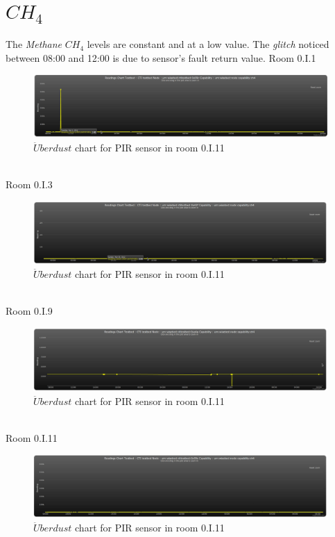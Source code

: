 \documentclass[12pt,a4paper]{report}
\begin{document}
\section{$CH_4$}
%
The \textit{Methane} $CH_4$ levels are constant and at a low value. The \textit{glitch} noticed between 08:00 and 12:00 is due to sensor's fault return value.
{Room 0.I.1}
%
\begin{figure}[H]
\centering
\includegraphics*[scale=0.3]{ch4_1}
\caption{$\ddot{U}berdust$ chart for PIR sensor in room 0.I.11}
\label{chart_ch4_1}
\end{figure}
\ \\
%
{Room 0.I.3}
%
\begin{figure}[H]
\centering
\includegraphics*[scale=0.3]{ch4_3}
\caption{$\ddot{U}berdust$ chart for PIR sensor in room 0.I.11}
\label{chart_ch4_3}
\end{figure}
\ \\
%
{Room 0.I.9}
%
\begin{figure}[H]
\centering
\includegraphics*[scale=0.3]{ch4_9}
\caption{$\ddot{U}berdust$ chart for PIR sensor in room 0.I.11}
\label{chart_ch4_9}
\end{figure}
\ \\
%
{Room 0.I.11}
%
\begin{figure}[H]
\centering
\includegraphics*[scale=0.3]{ch4_11}
\caption{$\ddot{U}berdust$ chart for PIR sensor in room 0.I.11}
\label{chart_ch4_11}
\end{figure}
\ \\
%
\end{document}
